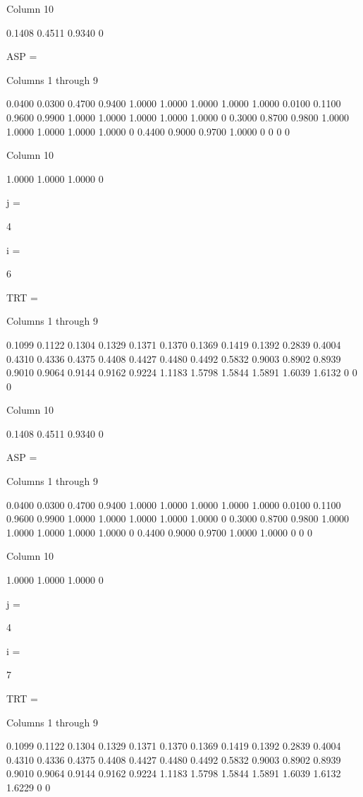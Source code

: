   Column 10

    0.1408
    0.4511
    0.9340
         0


ASP =

  Columns 1 through 9

    0.0400    0.0300    0.4700    0.9400    1.0000    1.0000    1.0000    1.0000    1.0000
    0.0100    0.1100    0.9600    0.9900    1.0000    1.0000    1.0000    1.0000    1.0000
         0    0.3000    0.8700    0.9800    1.0000    1.0000    1.0000    1.0000    1.0000
         0    0.4400    0.9000    0.9700    1.0000         0         0         0         0

  Column 10

    1.0000
    1.0000
    1.0000
         0


j =

     4


i =

     6


TRT =

  Columns 1 through 9

    0.1099    0.1122    0.1304    0.1329    0.1371    0.1370    0.1369    0.1419    0.1392
    0.2839    0.4004    0.4310    0.4336    0.4375    0.4408    0.4427    0.4480    0.4492
    0.5832    0.9003    0.8902    0.8939    0.9010    0.9064    0.9144    0.9162    0.9224
    1.1183    1.5798    1.5844    1.5891    1.6039    1.6132         0         0         0

  Column 10

    0.1408
    0.4511
    0.9340
         0


ASP =

  Columns 1 through 9

    0.0400    0.0300    0.4700    0.9400    1.0000    1.0000    1.0000    1.0000    1.0000
    0.0100    0.1100    0.9600    0.9900    1.0000    1.0000    1.0000    1.0000    1.0000
         0    0.3000    0.8700    0.9800    1.0000    1.0000    1.0000    1.0000    1.0000
         0    0.4400    0.9000    0.9700    1.0000    1.0000         0         0         0

  Column 10

    1.0000
    1.0000
    1.0000
         0


j =

     4


i =

     7


TRT =

  Columns 1 through 9

    0.1099    0.1122    0.1304    0.1329    0.1371    0.1370    0.1369    0.1419    0.1392
    0.2839    0.4004    0.4310    0.4336    0.4375    0.4408    0.4427    0.4480    0.4492
    0.5832    0.9003    0.8902    0.8939    0.9010    0.9064    0.9144    0.9162    0.9224
    1.1183    1.5798    1.5844    1.5891    1.6039    1.6132    1.6229         0         0

